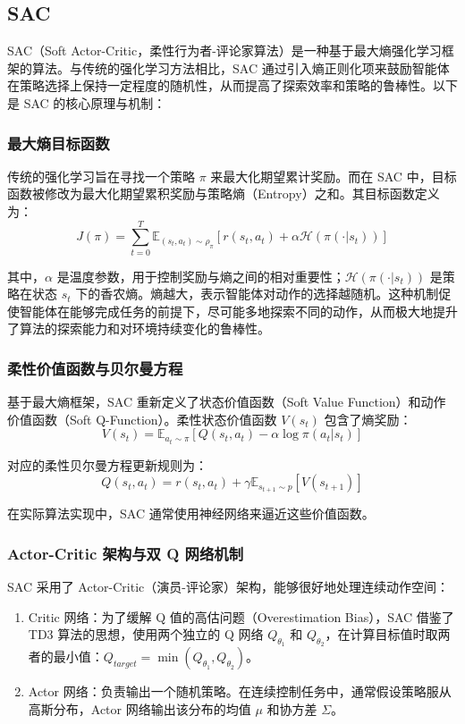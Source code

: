 \documentclass[
  oneside,
  degree=bachelor,
  fullwidthstop=false,
  fontset=fandol,
  times=false,
  minted=true,
  biblatex=true,
]{tongjithesis}
\begin{document}
\subsection{SAC}
SAC（Soft Actor-Critic，柔性行为者-评论家算法）是一种基于最大熵强化学习框架的算法。与传统的强化学习方法相比，SAC 通过引入熵正则化项来鼓励智能体在策略选择上保持一定程度的随机性，从而提高了探索效率和策略的鲁棒性。以下是 SAC 的核心原理与机制：

\subsubsection{最大熵目标函数}
传统的强化学习旨在寻找一个策略 $\pi$ 来最大化期望累计奖励。而在 SAC 中，目标函数被修改为最大化期望累积奖励与策略熵（Entropy）之和。其目标函数定义为：
\begin{equation}
    J(\pi) = \sum_{t=0}^{T} \mathbb{E}_{(s_t, a_t) \sim \rho_\pi} \left[ r(s_t, a_t) + \alpha \mathcal{H}(\pi(\cdot|s_t)) \right]
\end{equation}

其中，$\alpha$ 是温度参数，用于控制奖励与熵之间的相对重要性；$\mathcal{H}(\pi(\cdot|s_t))$ 是策略在状态 $s_t$ 下的香农熵。熵越大，表示智能体对动作的选择越随机。这种机制促使智能体在能够完成任务的前提下，尽可能多地探索不同的动作，从而极大地提升了算法的探索能力和对环境持续变化的鲁棒性。

\subsubsection{柔性价值函数与贝尔曼方程}
基于最大熵框架，SAC 重新定义了状态价值函数（Soft Value Function）和动作价值函数（Soft Q-Function）。柔性状态价值函数 $V(s_t)$ 包含了熵奖励：
\begin{equation}
    V(s_t) = \mathbb{E}_{a_t \sim \pi} \left[ Q(s_t, a_t) - \alpha \log \pi(a_t|s_t) \right]
\end{equation}

对应的柔性贝尔曼方程更新规则为：
\begin{equation}
    Q(s_t, a_t) = r(s_t, a_t) + \gamma \mathbb{E}_{s_{t+1} \sim p} \left[ V(s_{t+1}) \right]
\end{equation}

在实际算法实现中，SAC 通常使用神经网络来逼近这些价值函数。

\subsubsection{Actor-Critic 架构与双 Q 网络机制}
SAC 采用了 Actor-Critic（演员-评论家）架构，能够很好地处理连续动作空间：
\begin{enumerate}
    \item Critic 网络：为了缓解 Q 值的高估问题（Overestimation Bias），SAC 借鉴了 TD3 算法的思想，使用两个独立的 Q 网络 $Q_{\theta_1}$ 和 $Q_{\theta_2}$，在计算目标值时取两者的最小值：$Q_{target} = \min(Q_{\theta_1}, Q_{\theta_2})$。
    \item Actor 网络：负责输出一个随机策略。在连续控制任务中，通常假设策略服从高斯分布，Actor 网络输出该分布的均值 $\mu$ 和协方差 $\Sigma$。
\end{enumerate}
\end{document}
